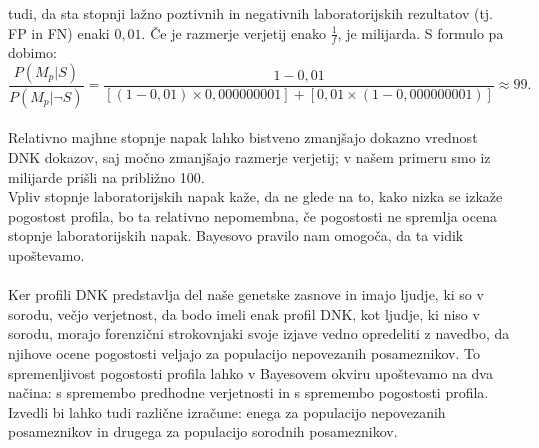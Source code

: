 \documentclass[fin1, tisk]{fmfdelo}
\theoremstyle{definition}
\theoremstyle{trditev}
\theoremstyle{izrek}
\begin{document}
tudi, da sta stopnji lažno poztivnih in negativnih laboratorijskih rezultatov (tj. FP in FN) enaki $0,01$. Če je razmerje verjetij enako
$\frac{1}{f}$, je milijarda. S formulo pa dobimo:
\[
   \frac{P(M_p \lvert S)}{P(M_p \lvert \neg S)} = \frac{1 - 0,01}{[(1 - 0,01) \times 0,000000001] + [0,01 \times (1 - 0,000000001)]} \approx 99.
\]\\
Relativno majhne stopnje napak lahko bistveno zmanjšajo dokazno vrednost DNK dokazov, saj močno zmanjšajo razmerje verjetij; v našem primeru
smo iz milijarde prišli na približno 100. \\
Vpliv stopnje laboratorijskih napak kaže, da ne glede na to, kako nizka se izkaže pogostost profila,
bo ta relativno nepomembna, če pogostosti ne spremlja ocena stopnje laboratorijskih napak. Bayesovo pravilo nam omogoča, da ta vidik upoštevamo.\\\\
Ker profili DNK predstavlja del naše genetske zasnove in imajo ljudje, ki so v sorodu, večjo verjetnost, da bodo imeli enak profil DNK, kot ljudje,
ki niso v sorodu, morajo forenzični strokovnjaki svoje izjave vedno opredeliti z navedbo, da njihove ocene pogostosti veljajo za populacijo nepovezanih
posameznikov. To spremenljivost pogostosti profila lahko v Bayesovem okviru upoštevamo na dva načina: s spremembo predhodne verjetnosti in s
spremembo pogostosti profila. Izvedli bi lahko tudi različne izračune: enega za populacijo nepovezanih posameznikov in drugega za populacijo
sorodnih posameznikov.

\end{document}

